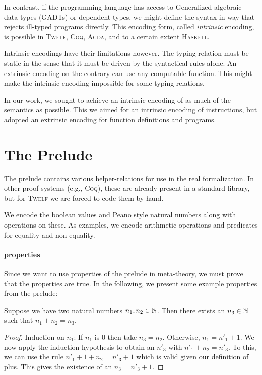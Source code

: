 \documentclass[a4paper, oneside, 10pt, draft]{memoir}
\newcommand{\twelf}{\textsc{Twelf}}
\newcommand{\coq}{\textsc{Coq}}
\newcommand{\agda}{\textsc{Agda}}
\newcommand{\haskell}{\textsc{Haskell}}
\begin{document}
In contrast, if the programming language has access to Generalized
algebraic data-types (GADTs) or dependent types, we might define the
syntax in way that rejects ill-typed programs directly. This encoding
form, called \emph{intrinsic} encoding, is possible in \twelf{},
\coq{}, \agda{}, and to a certain extent \haskell{}.

Intrinsic encodings have their limitations however. The typing
relation must be static in the sense that it must be driven by the
syntactical rules alone. An extrinsic encoding on the contrary can use
any computable function. This might make the
intrinsic encoding impossible for some typing relations.

In our work, we sought to achieve an intrinsic encoding of as much of
the semantics as possible. This we aimed for an intrinsic encoding of
instructions, but adopted an extrinsic encoding for function
definitions and programs.

\section{The Prelude}

The prelude contains various helper-relations for use in the real
formalization. In other proof systems (e.g., \coq{}\cite{team:coq*1}),
these are already present in a standard library, but for \twelf{} we
are forced to code them by hand.

We encode the boolean values and Peano style natural numbers along with
operations on these. As examples, we encode arithmetic operations and
predicates for equality and non-equality.

\paragraph{properties}

Since we want to use properties of the prelude in meta-theory, we must
prove that the properties are true. In the following, we present some
example properties from the prelude:
\begin{lem}
  Suppose we have two natural numbers $n_1, n_2 \in \mathbb{N}$. Then there
  exists an $n_3 \in \mathbb{N}$ such that $n_1 + n_2 = n_3$.
\end{lem}
\begin{proof}
  Induction on $n_1$: If $n_1$ is $0$ then take $n_3 =
  n_2$. Otherwise, $n_1 = n'_1 + 1$. We now apply the induction
  hypothesis to obtain an $n'_3$ with $n'_1 + n_2 = n'_3$. To this, we
  can use the rule $n'_1 + 1 + n_2 = n'_3 + 1$ which is valid given
  our definition of plus. This gives the existence of an $n_3 = n'_3 +
  1$.
\end{proof}
\end{document}
